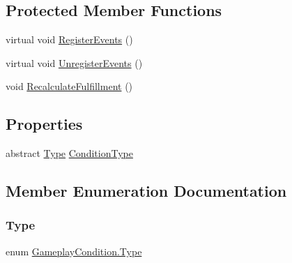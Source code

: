 \subsection*{Protected Member Functions}
\begin{DoxyCompactItemize}
\item 
virtual void \mbox{\hyperlink{class_gameplay_condition_ae40b690b7dbe3977bcd4429b7bf95afb}{Register\+Events}} ()
\item 
virtual void \mbox{\hyperlink{class_gameplay_condition_a70bf44c9b6395036a59c58611578cac6}{Unregister\+Events}} ()
\item 
void \mbox{\hyperlink{class_gameplay_condition_a7a2aee3d10c9b6e7a77b5bdf447e65bd}{Recalculate\+Fulfillment}} ()
\end{DoxyCompactItemize}
\subsection*{Properties}
\begin{DoxyCompactItemize}
\item 
abstract \mbox{\hyperlink{class_gameplay_condition_af7549fe9ce5328062dab831d05ca9702}{Type}} \mbox{\hyperlink{class_gameplay_condition_a5e18277f580329a304d95c2f920bde47}{Condition\+Type}}
\end{DoxyCompactItemize}


\subsection{Member Enumeration Documentation}
\mbox{\label{class_gameplay_condition_af7549fe9ce5328062dab831d05ca9702}} 
\subsubsection{\texorpdfstring{Type}{Type}}
{\footnotesize\ttfamily enum \mbox{\hyperlink{class_gameplay_condition_af7549fe9ce5328062dab831d05ca9702}{Gameplay\+Condition.\+Type}}\hspace{0.3cm}{\ttfamily [strong]}}

